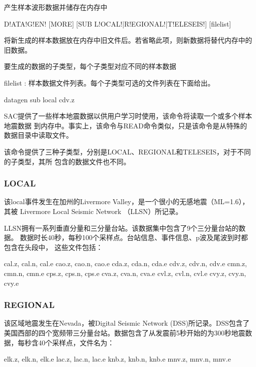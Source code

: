 \label{cmd:datagen}

产生样本波形数据并储存在内存中

\begin{SACSTX}
D!ATA!G!EN! [MORE] [SUB L!OCAL!|R!EGIONAL!|T!ELESEIS!] [filelist]
\end{SACSTX}

\begin{description}
\item [MORE] 将新生成的样本数据放在内存中旧文件后。若省略此项，则新数据将替代内存中的旧数据。
\item [SUB LOCAL|REGIONAL|TELESEIS] 要生成的数据的子类型，每个子类型对应不同的样本数据
\item filelist : 样本数据文件列表。每个子类型可选的文件列表在下面给出。
\end{description}

\begin{SACDFT}
datagen sub local cdv.z
\end{SACDFT}

SAC提供了一些样本地震数据以供用户学习时使用，该命令将读取一个或多个样本地震数据
到内存中。事实上，该命令与READ命令类似，只是该命令是从特殊的数据目录中读取文件。

该命令提供了三种子类型，分别是LOCAL、REGIONAL和TELESEIS，对于不同的子类型，其所
包含的数据文件也不同。

\subsubsection*{LOCAL}
该local事件发生在加州的Livermore Valley，是一个很小的无感地震（ML=1.6），其被
Livermore Local Seismic Network （LLSN）所记录。

LLSN拥有一系列垂直分量和三分量台站。该数据集中包含了9个三分量台站的数据。
数据时长40秒，每秒100个采样点。台站信息、事件信息、p波及尾波到时都包含在头段中，
这些文件包括：
\begin{SACCode}
    cal.z, cal.n, cal.e
    cao.z, cao.n, cao.e
    cda.z, cda.n, cda.e
    cdv.z, cdv.n, cdv.e
    cmn.z, cmn.n, cmn.e
    cps.z, cps.n, cps.e
    cva.z, cva.n, cva.e
    cvl.z, cvl.n, cvl.e
    cvy.z, cvy.n, cvy.e
\end{SACCode}

\subsubsection*{REGIONAL}
该区域地震发生在Nevada，被Digital Seismic Network (DSS)所记录。DSS包含了美国西部的四个宽频带三分量台站。数据包含了从发震前5秒开始的为300秒地震数据，每秒含40个采样点，文件名为：
\begin{SACCode}
    elk.z, elk.n, elk.e
    lac.z, lac.n, lac.e
    knb.z, knb.n, knb.e
    mnv.z, mnv.n, mnv.e
\end{SACCode}

